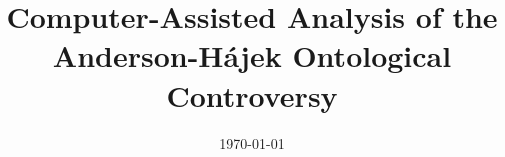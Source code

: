 \documentclass{birkjour}
\theoremstyle{definition}
\theoremstyle{remark}
\numberwithin{equation}{section}
\begin{document}
%
%
%
%
%
%
%
%
%


\title[The Anderson-Hájek Ontological Controversy]
{Computer-Assisted Analysis of the \\
Anderson-Hájek Ontological Controversy}















\date{\today}
\dedicatory{ }


\maketitle
\end{document}
